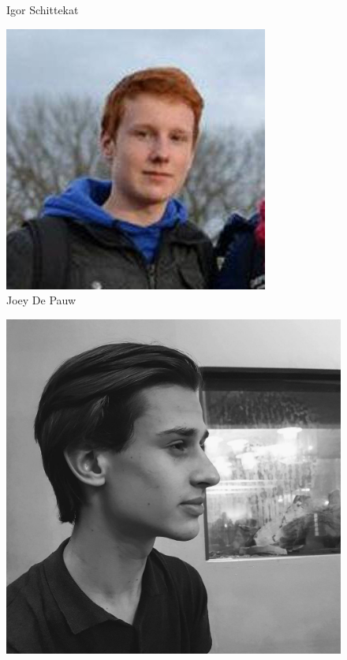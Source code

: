 \begin{frame}
\begin{figure}
\begin{minipage}{0.3\linewidth}
            	\footnotesize Igor Schittekat 
        	\end{minipage}
            \begin{minipage}{0.3\linewidth}
            	\centering
				\includegraphics[width=\linewidth]{res/joey} \\
            	\footnotesize Joey De Pauw
        	\end{minipage}
            \begin{minipage}{0.3\linewidth}
            	\centering
				\includegraphics[width=\linewidth]{res/senne} \\

\end{minipage}
\end{figure}
\end{frame}

